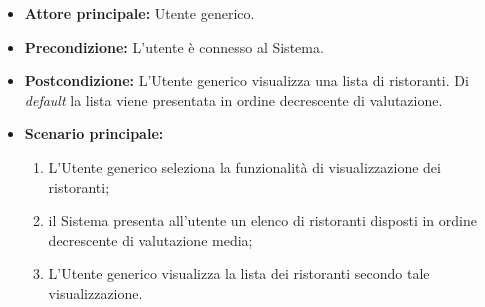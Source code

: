 \label{usecase:Visualizzazione elenco ristoranti}
\begin{itemize}
	\item \textbf{Attore principale:} Utente generico.

	\item \textbf{Precondizione:}
	      L'utente è connesso al Sistema.

	\item \textbf{Postcondizione:} L'Utente generico visualizza una lista di
	      ristoranti. Di \textit{default} la lista viene presentata in ordine decrescente di valutazione.

	\item \textbf{Scenario principale:}
	      \begin{enumerate}
		      \item L'Utente generico seleziona la funzionalità di
		            visualizzazione dei ristoranti;

		      \item il Sistema presenta all'utente un elenco di ristoranti disposti in ordine decrescente di valutazione media;

		      \item L'Utente generico visualizza la lista dei ristoranti secondo tale visualizzazione.

	      \end{enumerate}
\end{itemize}
